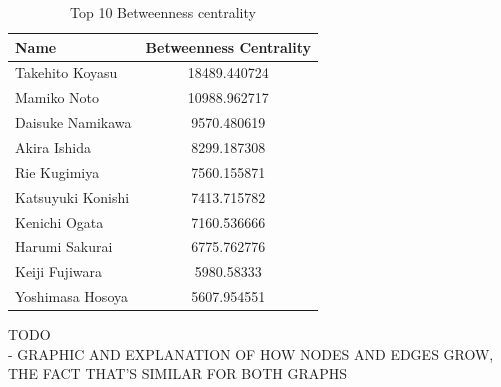 \begin{table}[!hbt]
	\begin{center}
	\caption{Top 10 Betweenness centrality}
	\label{tab:top10BtwC}
	\begin{tabular}{|l|c|}
		\hline
		Name & Betweenness Centrality \\ 
		\hline
		Takehito Koyasu & 18489.440724 \\ 
		\hline
		Mamiko Noto & 10988.962717 \\ 
		\hline
		Daisuke Namikawa & 9570.480619 \\ 
		\hline
		Akira Ishida & 8299.187308 \\ 
		\hline
		Rie Kugimiya & 7560.155871 \\ 
		\hline
		Katsuyuki Konishi & 7413.715782 \\ 
		\hline
		Kenichi Ogata & 7160.536666 \\ 
		\hline
		Harumi Sakurai & 6775.762776 \\ 
		\hline
		Keiji Fujiwara & 5980.58333 \\ 
		\hline
		Yoshimasa Hosoya & 5607.954551 \\ 
		\hline
	\end{tabular}
	\end{center}
\end{table}

TODO \\
- GRAPHIC AND EXPLANATION OF HOW NODES AND EDGES GROW, THE FACT THAT'S SIMILAR FOR BOTH GRAPHS


